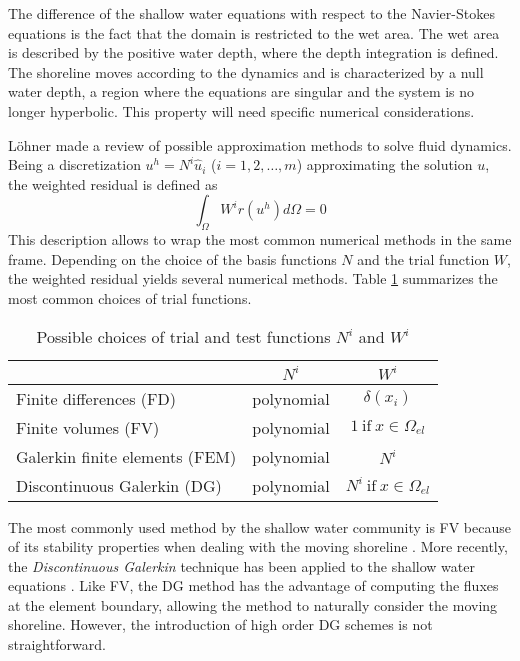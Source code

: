The difference of the shallow water equations with respect to the Navier-Stokes equations is the fact that the domain is restricted to the wet area. The wet area is described by the positive water depth, where the depth integration is defined. The shoreline moves according to the dynamics and is characterized by a null water depth, a region where the equations are singular and the system is no longer hyperbolic. This property will need specific numerical considerations.

Löhner \cite{lohner2008} made a review of possible approximation methods to solve fluid dynamics. Being a discretization $u^h = N^i\hat{u}_i$ ($i=1,2,\dots,m$) approximating the solution $u$, the weighted residual is defined as
\begin{equation*}
\int_{\Omega} W^ir(u^h)d\Omega = 0
\end{equation*}
This description allows to wrap the most common numerical methods in the same frame. Depending on the choice of the basis functions $N$ and the trial function $W$, the weighted residual yields several numerical methods. Table \ref{possible_trial_functions} summarizes the most common choices of trial functions.

\begin{table}
\centering
\begin{tabular}{|l|c|c|}
\hline
 & $N^i$ & $W^i$ \\ \hline
Finite differences (FD)         & polynomial & $\delta(x_i)$ \\ \hline
Finite volumes (FV)             & polynomial & $1 \ \text{if} \ x\in\Omega_{el}$ \\ \hline
Galerkin finite elements (FEM)  & polynomial & $N^i$ \\ \hline
Discontinuous Galerkin (DG)     & polynomial & $N^i \ \text{if} \ x\in\Omega_{el}$ \\ \hline
\end{tabular}
\caption{Possible choices of trial and test functions $N^i$ and $W^i$}
\label{possible_trial_functions}
\end{table}

The most commonly used method by the shallow water community is FV because of its stability properties when dealing with the moving shoreline \cite{abbott1978,leveque2002}. More recently, the \emph{Discontinuous Galerkin} technique has been applied to the shallow water equations \cite{ambati2007,khan2014,lee2019}. Like FV, the DG method has the advantage of computing the fluxes at the element boundary, allowing the method to naturally consider the moving shoreline. However, the introduction of high order DG schemes is not straightforward.

